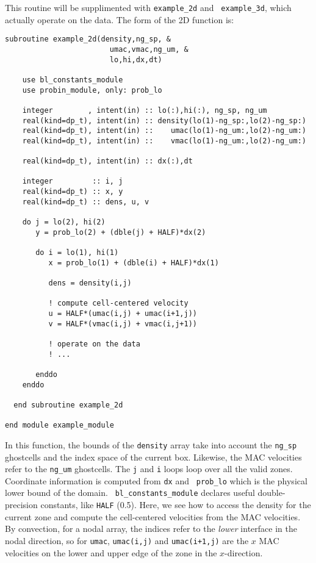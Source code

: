 This routine will be supplimented with {\tt example\_2d} and {\tt
example\_3d}, which actually operate on the data.  The form of 
the 2D function is:

\begin{lstlisting}[language={[95]fortran},mathescape=false]
  subroutine example_2d(density,ng_sp, &
                        umac,vmac,ng_um, &
                        lo,hi,dx,dt)

    use bl_constants_module
    use probin_module, only: prob_lo

    integer        , intent(in) :: lo(:),hi(:), ng_sp, ng_um
    real(kind=dp_t), intent(in) :: density(lo(1)-ng_sp:,lo(2)-ng_sp:)
    real(kind=dp_t), intent(in) ::    umac(lo(1)-ng_um:,lo(2)-ng_um:)
    real(kind=dp_t), intent(in) ::    vmac(lo(1)-ng_um:,lo(2)-ng_um:)

    real(kind=dp_t), intent(in) :: dx(:),dt

    integer         :: i, j
    real(kind=dp_t) :: x, y
    real(kind=dp_t) :: dens, u, v

    do j = lo(2), hi(2)
       y = prob_lo(2) + (dble(j) + HALF)*dx(2)

       do i = lo(1), hi(1)
          x = prob_lo(1) + (dble(i) + HALF)*dx(1)

          dens = density(i,j)

          ! compute cell-centered velocity
          u = HALF*(umac(i,j) + umac(i+1,j))
          v = HALF*(vmac(i,j) + vmac(i,j+1))

          ! operate on the data
          ! ...

       enddo
    enddo

  end subroutine example_2d

end module example_module
\end{lstlisting}

\noindent In this function, the bounds of the {\tt density} array take
into account the {\tt ng\_sp} ghostcells and the index space of the
current box.  Likewise, the MAC velocities refer to the {\tt ng\_um}
ghostcells.  The {\tt j} and {\tt i} loops loop over all the valid
zones.  Coordinate information is computed from {\tt dx} and {\tt
  prob\_lo} which is the physical lower bound of the domain.  {\tt
  bl\_constants\_module} declares useful double-precision constants,
like {\tt HALF} (0.5).  Here, we see how to access the density for
the current zone and compute the cell-centered velocities from the
MAC velocities.  By convection, for a nodal array, the indices refer 
to the {\em lower} interface in the nodal direction, so for {\tt umac},
{\tt umac(i,j)} and {\tt umac(i+1,j)} are the $x$ MAC velocities
on the lower and upper edge of the zone in the $x$-direction.

